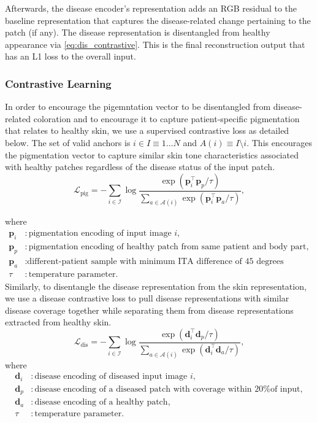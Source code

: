 \documentclass{midl} %
\begin{document}
Afterwards, the disease encoder's representation adds an RGB residual to the baseline representation that captures the disease-related change pertaining to the patch (if any). The disease representation is disentangled from healthy appearance via \eqref{eq:dis_contrastive}. This is the final reconstruction output that has an L1 loss to the overall input. 



\subsubsection{Contrastive Learning}
In order to encourage the pigemntation vector to be disentangled from disease-related coloration and to encourage it to capture patient-specific pigmentation that relates to healthy skin,  we use a supervised contrastive loss as detailed below. The set of valid anchors is $i \in I \equiv {1...N}$ and $A(i) \equiv I \setminus {i}$. This encourages the pigmentation vector to capture similar skin tone characteristics associated with healthy patches regardless of the disease status of the input patch. \\
\begin{equation}[pig]
\mathcal{L}_{\mathrm{pig}}
=
-\sum_{i\in\mathcal{I}}
\log
\frac{
\exp\left(\mathbf{p}_i^\top \mathbf{p}_p / \tau\right)
}{
\sum_{a\in\mathcal{A}(i)}
\exp\left(\mathbf{p}_i^\top \mathbf{p}_a / \tau\right)
},
\label{eq:pig_contrastive}
\end{equation}

\noindent where
\[
\begin{aligned}
\mathbf{p}_i &: \text{pigmentation encoding of input image } i,\\
\mathbf{p}_p &: \text{pigmentation encoding of healthy patch from same patient and body part},\\
\mathbf{p}_a &: \text{different-patient sample with minimum ITA difference of 45 degrees} \\
\tau &: \text{temperature parameter}.
\end{aligned}
\]
Similarly, to disentangle the disease representation from the skin representation, we use a disease contrastive loss to pull disease representations
with similar disease coverage together while separating them from disease representations extracted from healthy
skin. \\
\begin{equation}
\mathcal{L}_{\mathrm{dis}}
=
-\sum_{i\in\mathcal{I}}
\log
\frac{
\exp\left(\mathbf{d}_i^\top \mathbf{d}_p / \tau\right)
}{
\sum_{a\in\mathcal{A}(i)}
\exp\left(\mathbf{d}_i^\top \mathbf{d}_a / \tau\right)
},
\label{eq:dis_contrastive}
\end{equation}
\noindent where
\[
\begin{aligned}
\mathbf{d}_i &: \text{disease encoding of diseased input image } i,\\
\mathbf{d}_p &: \text{disease encoding of a diseased patch with coverage within 20\% of input},\\
\mathbf{d}_a &: \text{disease encoding of a healthy patch},\\
\tau &: \text{temperature parameter}.
\end{aligned}
\]
\end{document}
